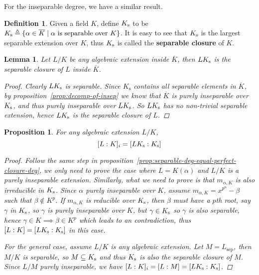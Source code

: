 \documentclass[a4paper]{article}
\newcommand{\defeq}{\triangleq}
\theoremstyle{mystyle}
\newtheorem{lemma}{Lemma}
\newtheorem{proposition}{Proposition}
\theoremstyle{remark}
\theoremstyle{definition}
\theoremstyle{definition}
\newtheorem{definition}{Definition}
\begin{document}
  For the inseparable degree, we have a similar result.

  \begin{definition}
    Given a field $K$, define $K_\mathrm{s}$ to be
    $\Ks \defeq \{ \alpha \in \overline{K} \mid \alpha \text{ is separable over } K \}$.
    It is easy to see that $K_\mathrm{s}$ is the largest separable extension over $K$, thus
    $K_\mathrm{s}$ is called the {\bf separable closure} of $K$.
  \end{definition}

  \begin{lemma} \label{lemma:separable-closure-of-ext}
    Let $L/K$ be any algebraic extension inside $\overline{K}$, then $L K_\mathrm{s}$ is
    the separable closure of $L$ inside $\overline{K}$.

    \begin{proof}
      Clearly $L K_\mathrm{s}$ is separable.
      Since $K_\text{s}$ contains all separable elements in $\overline{K}$, by proposition~\ref{prop:decomp-of-insep}
      we know that $\overline{K}$ is purely inseparable over $K_\mathrm{s}$, and thus purely inseparable over $L K_\mathrm{s}$.
      So $L K_\mathrm{s}$ has no non-trivial separable extension, hence $LK_\mathrm{s}$ is the separable closure of $L$.
    \end{proof}
  \end{lemma}

  \begin{proposition}
    For any algebraic extension $L/K$,
    \[ [L: K]_i = [L K_\mathrm{s}: K_\mathrm{s}] \]

    \begin{proof}
      Follow the same step in proposition~\ref{prop:separable-deg-equal-perfect-closure-deg},
      we only need to prove the case where $L = K(\alpha)$ and $L/K$ is a purely inseparable extension.
      Similarly, what we need to prove is that $m_{\alpha, K}$ is also irreducible in $K_\mathrm{s}$.
      Since $\alpha$ purely inseparable over $K$, assume $m_{\alpha, K} = x^{p^n} - \beta$
      such that $\beta \not\in K^p$. If $m_{\alpha, K}$ is reducible over $K_\mathrm{s}$, then
      $\beta$ must have a $p$th root, say $\gamma$ in $K_\mathrm{s}$, so $\gamma$ is purely inseparable over $K$,
      but $\gamma \in K_\mathrm{s}$ so $\gamma$ is also separable, hence $\gamma \in K \implies \beta \in K^p$
      which leads to an contradiction, thus $[L: K] = [L K_\mathrm{s}: K_\mathrm{s}]$ in this case.

      For the general case, assume $L/K$ is any algebraic extension. Let $M = L_\text{sep}$,
      then $M/K$ is separable, so $M \subseteq K_\mathrm{s}$ and thus $K_\mathrm{s}$ is also the separable closure of $M$.
      Since $L/M$ purely inseparable, we have $[L: K]_i = [L: M] = [L K_\mathrm{s}: K_\mathrm{s}]$.
    \end{proof}
  \end{proposition}
\end{document}

